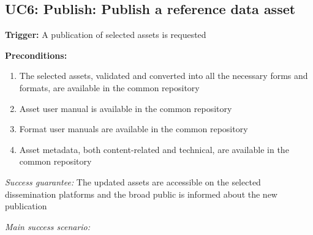 	\subsection{UC6: Publish: Publish a reference data asset}
	\label{sec:uc6}		
	
	\textbf{Trigger:} A publication of selected assets is requested
	
	\textbf{Preconditions:} 
	\begin{enumerate}
		\item The selected assets, validated and converted into all the necessary forms and formats, are available in the common repository
		\item Asset user manual is available in the common repository
		\item Format user manuals are available in the common repository
		\item Asset metadata, both content-related and technical, are available in the common repository
	\end{enumerate}

	\textit{Success guarantee:} The updated assets are accessible on the selected dissemination platforms and the broad public is informed about the new publication

	\textit{Main success scenario:} 
	
